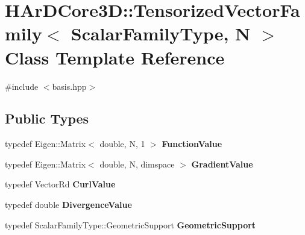 \hypertarget{classHArDCore3D_1_1TensorizedVectorFamily}{}\section{H\+Ar\+D\+Core3D\+:\+:Tensorized\+Vector\+Family$<$ Scalar\+Family\+Type, N $>$ Class Template Reference}
\label{classHArDCore3D_1_1TensorizedVectorFamily}


{\ttfamily \#include $<$basis.\+hpp$>$}

\subsection*{Public Types}
\begin{DoxyCompactItemize}
\item 
\mbox{\label{classHArDCore3D_1_1TensorizedVectorFamily_a5a0fe2c82baec8624b201a536551fba1}} 
typedef Eigen\+::\+Matrix$<$ double, N, 1 $>$ {\bfseries Function\+Value}
\item 
\mbox{\label{classHArDCore3D_1_1TensorizedVectorFamily_a882d73f02d56827fc7f051ebf2a6befb}} 
typedef Eigen\+::\+Matrix$<$ double, N, dimspace $>$ {\bfseries Gradient\+Value}
\item 
\mbox{\label{classHArDCore3D_1_1TensorizedVectorFamily_a2a99d3ad58e081c33fe712c019b0d704}} 
typedef Vector\+Rd {\bfseries Curl\+Value}
\item 
\mbox{\label{classHArDCore3D_1_1TensorizedVectorFamily_a375f5cfa1074a92ef276ba76145d2b83}} 
typedef double {\bfseries Divergence\+Value}
\item 
\mbox{\label{classHArDCore3D_1_1TensorizedVectorFamily_ac71379becbe0edb006c5df44660bf3aa}} 
typedef Scalar\+Family\+Type\+::\+Geometric\+Support {\bfseries Geometric\+Support}
\end{DoxyCompactItemize}
